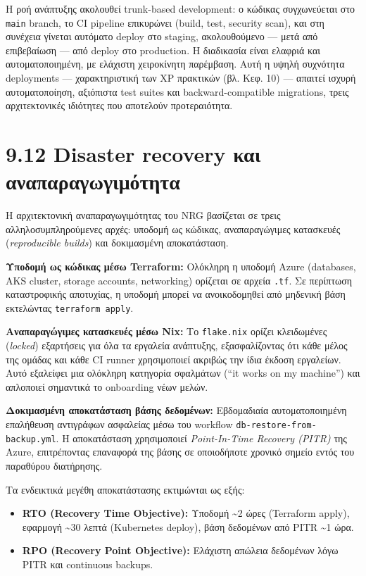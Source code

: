 Η ροή ανάπτυξης ακολουθεί trunk-based development: ο κώδικας
συγχωνεύεται στο \texttt{main} branch, το CI pipeline επικυρώνει (build,
test, security scan), και στη συνέχεια γίνεται αυτόματο deploy στο
staging, ακολουθούμενο --- μετά από επιβεβαίωση --- από deploy στο
production. Η διαδικασία είναι ελαφριά και αυτοματοποιημένη, με ελάχιστη
χειροκίνητη παρέμβαση. Αυτή η υψηλή συχνότητα deployments ---
χαρακτηριστική των XP πρακτικών (βλ. Κεφ. 10) --- απαιτεί ισχυρή
αυτοματοποίηση, αξιόπιστα test suites και backward-compatible
migrations, τρεις αρχιτεκτονικές ιδιότητες που αποτελούν προτεραιότητα.

\section{9.12 Disaster recovery και
αναπαραγωγιμότητα}\label{disaster-recovery-ux3baux3b1ux3b9-ux3b1ux3bdux3b1ux3c0ux3b1ux3c1ux3b1ux3b3ux3c9ux3b3ux3b9ux3bcux3ccux3c4ux3b7ux3c4ux3b1}

Η αρχιτεκτονική αναπαραγωγιμότητας του NRG βασίζεται σε τρεις
αλληλοσυμπληρούμενες αρχές: υποδομή ως κώδικας, αναπαραγώγιμες
κατασκευές (\emph{reproducible builds}) και δοκιμασμένη αποκατάσταση.

\textbf{Υποδομή ως κώδικας μέσω Terraform:} Ολόκληρη η υποδομή Azure
(databases, AKS cluster, storage accounts, networking) ορίζεται σε
αρχεία \texttt{.tf}. Σε περίπτωση καταστροφικής αποτυχίας, η υποδομή
μπορεί να ανοικοδομηθεί από μηδενική βάση εκτελώντας
\texttt{terraform\ apply}.

\textbf{Αναπαραγώγιμες κατασκευές μέσω Nix:} Το \texttt{flake.nix}
ορίζει κλειδωμένες (\emph{locked}) εξαρτήσεις για όλα τα εργαλεία
ανάπτυξης, εξασφαλίζοντας ότι κάθε μέλος της ομάδας και κάθε CI runner
χρησιμοποιεί ακριβώς την ίδια έκδοση εργαλείων. Αυτό εξαλείφει μια
ολόκληρη κατηγορία σφαλμάτων (``it works on my machine'') και απλοποιεί
σημαντικά το onboarding νέων μελών.

\textbf{Δοκιμασμένη αποκατάσταση βάσης δεδομένων:} Εβδομαδιαία
αυτοματοποιημένη επαλήθευση αντιγράφων ασφαλείας μέσω του workflow
\texttt{db-restore-from-backup.yml}. Η αποκατάσταση χρησιμοποιεί
\emph{Point-In-Time Recovery (PITR)} της Azure, επιτρέποντας επαναφορά
της βάσης σε οποιοδήποτε χρονικό σημείο εντός του παραθύρου διατήρησης.

Τα ενδεικτικά μεγέθη αποκατάστασης εκτιμώνται ως εξής:

\begin{itemize}
\tightlist
\item
  \textbf{RTO (Recovery Time Objective):} Υποδομή \textasciitilde2 ώρες
  (Terraform apply), εφαρμογή \textasciitilde30 λεπτά (Kubernetes
  deploy), βάση δεδομένων από PITR \textasciitilde1 ώρα.
\item
  \textbf{RPO (Recovery Point Objective):} Ελάχιστη απώλεια δεδομένων
  λόγω PITR και continuous backups.
\end{itemize}

